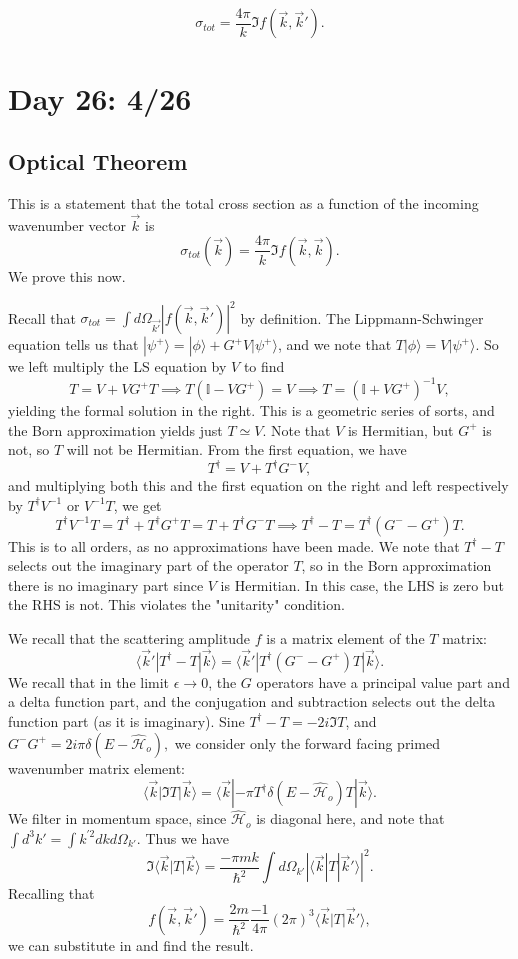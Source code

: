 \documentclass[fontsize=12pt]{scrartcl}
\newcommand{\bb}[1]{\mathbb{#1}}
\newcommand{\Id}{\bb{I}}
\newcommand{\la}{\langle}
\newcommand{\ra}{\rangle}
\newcommand{\Ham}{\hat{\mathcal{H}}}
\begin{document}
$$\sigma_{tot}=\frac{4\pi}{k}\Im f(\vec{k},\vec{k}').$$

\section{Day 26: 4/26}

\subsection{Optical Theorem}

This is a statement that the total cross section as a function of the incoming wavenumber vector $\vec{k}$ is $$\sigma_{tot}(\vec{k})=\frac{4\pi}{k}\Im f(\vec{k},\vec{k}).$$ We prove this now.

Recall that $\sigma_{tot}=\int d\Omega_{\vec{k'}}|f(\vec{k},\vec{k}')|^2$ by definition. The Lippmann-Schwinger equation tells us that $|\psi^+\ra = |\phi\ra + G^+V|\psi^+\ra$, and we note that $T|\phi\ra = V|\psi^+\ra$. So we left multiply the LS equation by $V$ to find $$T=V+VG^+T\implies T(\Id - VG^+)=V \implies T = (\Id+VG^+)^{-1} V,$$ yielding the formal solution in the right. This is a geometric series of sorts, and the Born approximation yields just $T\simeq V$. Note that $V$ is Hermitian, but $G^+$ is not, so $T$ will not be Hermitian. From the first equation, we have $$T^\dagger = V+T^\dagger G^- V,$$ and multiplying both this and the first equation on the right and left respectively by $T^\dagger V^{-1}$ or $V^{-1}T$, we get $$T^\dagger V^{-1} T = T^\dagger + T^\dagger G^+ T = T+T^\dagger G^- T\implies T^\dagger-T = T^\dagger(G^--G^+)T.$$ This is to all orders, as no approximations have been made. We note that $T^\dagger-T$ selects out the imaginary part of the operator $T$, so in the Born approximation there is no imaginary part since $V$ is Hermitian. In this case, the LHS is zero but the RHS is not. This violates the "unitarity" condition.

We recall that the scattering amplitude $f$ is a matrix element of the $T$ matrix: $$\la \vec{k}'|T^\dagger-T|\vec{k}\ra = \la \vec{k}'|T^\dagger(G^--G^+)T|\vec{k}\ra.$$ We recall that in the limit $\epsilon\to 0$, the $G$ operators have a principal value part and a delta function part, and the conjugation and subtraction selects out the delta function part (as it is imaginary). Sine $T^\dagger-T = -2i \Im T$, and $G^-G^+=2i\pi \delta(E-\Ham_o),$ we consider only the forward facing primed wavenumber matrix element: $$\la\vec{k}|\Im T|\vec{k}\ra = \la \vec{k}|-\pi T^\dagger \delta(E-\Ham_o)T|\vec{k}\ra.$$ We filter in momentum space, since $\Ham_o$ is diagonal here, and note that $\int d^3k' = \int k^{'2} dk d\Omega_{k'}$. Thus we have $$\Im \la \vec{k}|T|\vec{k}\ra = \frac{-\pi mk}{\hbar^2}\int d\Omega_{k'}|\la \vec{k}|T|\vec{k}'\ra|^2.$$ Recalling that $$f(\vec{k},\vec{k}') = \frac{2m}{\hbar^2}\frac{-1}{4\pi} (2\pi)^3 \la \vec{k}|T|\vec{k}'\ra,$$ we can substitute in and find the result.
\end{document}

